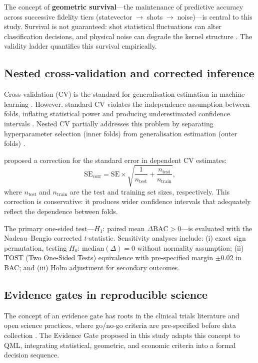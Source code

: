 \documentclass[11pt,a4paper]{article}
\newcommand{\BAC}{\mathrm{BAC}}
\begin{document}
The concept of \textbf{geometric survival}---the maintenance of predictive
accuracy across successive fidelity tiers
(statevector$\;\to\;$shots$\;\to\;$noise)---is central to this study.
Survival is not guaranteed: shot statistical fluctuations can alter
classification decisions, and physical noise can degrade the kernel structure
\citep{heyrand2022noisy}. The validity ladder quantifies this survival
empirically.

\subsection{Nested cross-validation and corrected inference}
\label{ssec:cv}

Cross-validation (CV) is the standard for generalisation estimation in machine
learning \citep{refsgaard1999proper}. However, standard CV violates the
independence assumption between folds, inflating statistical power and
producing underestimated confidence intervals \citep{nadeau2003inference}.
Nested CV partially addresses this problem by separating hyperparameter
selection (inner folds) from generalisation estimation (outer folds)
\citep{refsgaard1999proper}.

\citet{nadeau2003inference} proposed a correction for the standard error in
dependent CV estimates:
\begin{equation}
  \mathrm{SE}_{\mathrm{corr}}
  = \mathrm{SE} \times
    \sqrt{\frac{1}{n_{\text{test}}} + \frac{n_{\text{test}}}{n_{\text{train}}}},
  \label{eq:nadeau}
\end{equation}
where $n_{\text{test}}$ and $n_{\text{train}}$ are the test and training set
sizes, respectively. This correction is conservative: it produces wider
confidence intervals that adequately reflect the dependence between folds.

The primary one-sided test---$H_1$: paired mean $\Delta\BAC > 0$---is
evaluated with the Nadeau--Bengio corrected $t$-statistic. Sensitivity analyses
include: (i) exact sign permutation, testing $H_0$:
$\mathrm{median}(\Delta)=0$ without normality assumption; (ii) TOST
(Two One-Sided Tests) equivalence with pre-specified margin $\pm 0.02$ in BAC;
and (iii) Holm adjustment for secondary outcomes.

\subsection{Evidence gates in reproducible science}
\label{ssec:evidencegates}

The concept of an evidence gate has roots in the clinical trials literature and
open science practices, where go/no-go criteria are pre-specified before data
collection \citep{scheel2022role}. The Evidence Gate proposed in this study
adapts this concept to QML, integrating statistical, geometric, and economic
criteria into a formal decision sequence.
\end{document}
